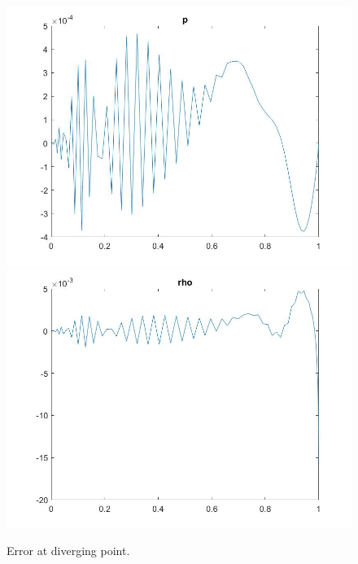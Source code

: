 \documentclass[11pt, a4paper]{article}
\theoremstyle{definition}
\begin{document}
\begin{figure}[h]
	\includegraphics[scale=0.3]{pD2.jpg}
	\includegraphics[scale=0.3]{rD2.jpg}
	\caption{Error at diverging point.}
\end{figure}
\end{document}
